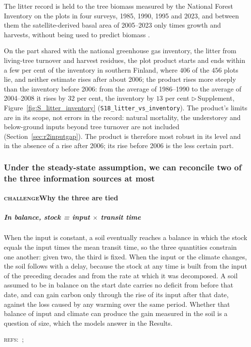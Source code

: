 \documentclass[11pt]{article}
\newcounter{subsubparagraph}[subparagraph]
\newcommand{\beat}[1]{\textcolor{black!45}{\textsc{\small #1}}\enspace}
\newcommand{\refs}[1]{\par\textcolor{red!70!black}{\footnotesize\textsc{refs:}\ #1}\par}
\newcommand{\suppanchor}[2]{\textcolor{red!70!black}{\small$\triangleright$\,Supplement,
  Figure~\ref{fig:#1} (\texttt{#2})}}
\begin{document}
The litter record is held to the tree biomass measured by the National Forest Inventory on the
plots in four surveys, 1985, 1990, 1995 and 2023, and between them the satellite-derived basal
area of 2005--2023 only times growth and harvests, without being used to predict biomass
\citep{TupekLitter}. 

On the part shared with the national greenhouse gas inventory, the litter from living-tree turnover
and harvest residues, the plot product starts and ends within a few per cent of the inventory in
southern Finland, where $406$ of the $456$ plots lie, and neither estimate rises after about 2006;
the product rises more steeply than the inventory before 2006: from the average of 1986--1990 to
the average of 2004--2008 it rises by $32$ per cent, the inventory by $13$ per cent
\suppanchor{S_litter_inventory}{S18\_litter\_vs\_inventory}.
The product's limits are in its
scope, not errors in the record: natural mortality, the understorey and below-ground inputs beyond
tree turnover are not included (Section~\ref{sec:r2inputgap}). The product is therefore most robust in its level and in the absence of a rise after 2006; its
rise before 2006 is the less certain part.


\subsubsection{Under the steady-state assumption, we can reconcile two of the three information sources at most}
\paragraph{\beat{challenge}Why the three are tied}
\subparagraph{In balance, stock = input $\times$ transit time}
When the input is constant, a soil eventually reaches a balance in which the stock equals the
input times the mean transit time, so the three quantities constrain one another: given two, the
third is fixed. When the input or the climate changes, the soil follows with a delay, because the
stock at any time is built from the input of the preceding decades and from the rate at which it
was decomposed. A soil assumed to be in balance on the start date carries no deficit from before
that date, and can gain carbon only through the rise of its input after that date, against the
loss caused by any warming over the same period. Whether that balance of input and climate can
produce the gain measured in the soil is a question of size, which the models answer in the
Results.
\refs{\citet{Olson1963}; \citet{Sierra2017}}
\end{document}
